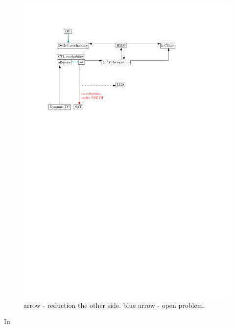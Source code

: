 \documentclass[acmsmall,review,nonacm]{acmart}\settopmatter{printfolios=true,printccs=false,printacmref=false}
\begin{document}
	\begin{figure}[!htp]
		
		\begin{center}  
			\includegraphics[scale = 0.6]{map_popl.pdf}
		\end{center}
	
		\caption{arrow - reduction the other side. blue arrow - open problem. \\
		}
		
	\end{figure}
	
	In \cite{valiant1975general}
	
	\subsection{}
	
\end{document}
